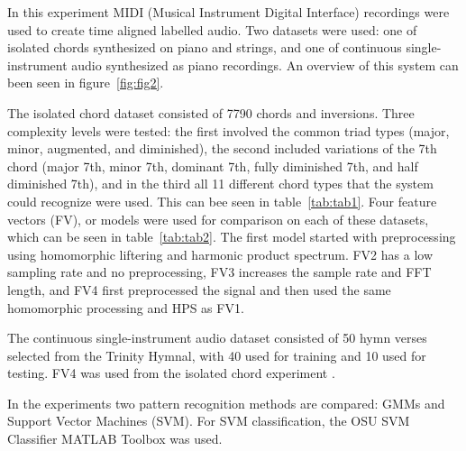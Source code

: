 \documentclass{sig-alternate}
\begin{document}

In this experiment MIDI (Musical Instrument Digital Interface) recordings were used to create time aligned labelled audio. Two datasets were used: one of isolated chords synthesized on piano and strings, and one of continuous single-instrument audio synthesized as piano recordings. An overview of this system can been seen in figure~\ref{fig:fig2}.

The isolated chord dataset consisted of 7790 chords and inversions. Three complexity levels were tested: the first involved the common triad types (major, minor, augmented, and diminished), the second included variations of the 7th chord (major 7th, minor 7th, dominant 7th, fully diminished 7th, and half diminished 7th), and in the third all 11 different chord types that the system could recognize were used. This can bee seen in table~\ref{tab:tab1}. Four feature vectors (FV), or models were used for comparison on each of these datasets, which can be seen in table~\ref{tab:tab2}. The first model started with preprocessing using homomorphic liftering and harmonic product spectrum. FV2 has a low sampling rate and no preprocessing, FV3 increases the sample rate and FFT length, and FV4 first preprocessed the signal and then used the same homomorphic processing and HPS as FV1.


The continuous single-instrument audio dataset consisted of 50 hymn verses selected from the Trinity Hymnal, with 40 used for training and 10 used for testing. FV4 was used from the isolated chord experiment \cite{Morman:2006}. 

In the experiments two pattern recognition methods are compared: GMMs and Support Vector Machines (SVM). For SVM classification, the OSU SVM Classifier MATLAB Toolbox was used. 

\begin{figure*}
\centering
{}
\caption{Overview of the chord recognition system used in the proper signal processing research case.}
\label{fig:fig2}
\end{figure*}
\end{document}
